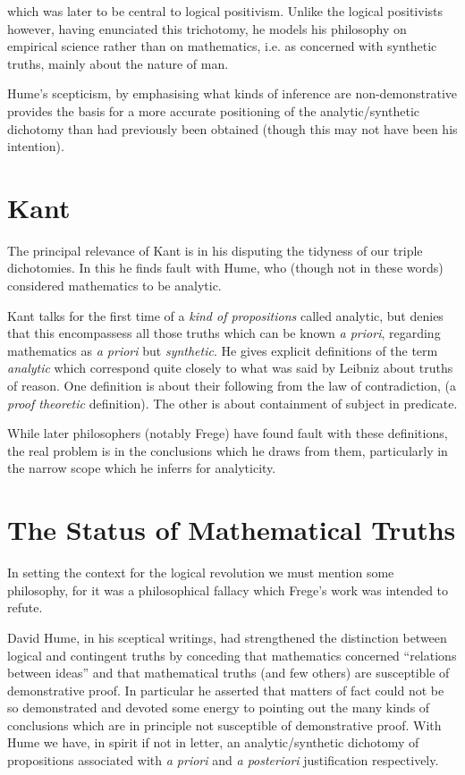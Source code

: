 which was later to be central to logical positivism.
Unlike the logical positivists however, having enunciated this trichotomy, he models his philosophy on empirical science rather than on mathematics, i.e. as concerned with synthetic truths, mainly about the nature of man.

Hume's scepticism, by emphasising what kinds of inference are non-demonstrative provides the basis for a more accurate positioning of the analytic/synthetic dichotomy than had previously been obtained (though this may not have been his intention).


\section{Kant}

The principal relevance of Kant is in his disputing the tidyness of our triple dichotomies.
In this he finds fault with Hume, who (though not in these words) considered mathematics to be analytic.

Kant talks for the first time of a {\it kind of propositions} called analytic, but denies that this encompassess all those truths which can be known {\it a priori}, regarding mathematics as {\it a priori} but {\it synthetic}.
He gives explicit definitions of the term {\it analytic} which correspond quite closely to what was said by Leibniz about truths of reason.
One definition is about their following from the law of contradiction, (a {\it proof theoretic} definition).
The other is about containment of subject in predicate.

While later philosophers (notably Frege) have found fault with these definitions, the real problem is in the conclusions which he draws from them, particularly in the narrow scope which he inferrs for analyticity.


\section{The Status of Mathematical Truths}

In setting the context for the logical revolution we must mention some philosophy, for it was a philosophical fallacy which Frege's work was intended to refute.

David Hume, in his sceptical writings, had strengthened the distinction between logical and contingent truths by conceding that mathematics concerned ``relations between ideas'' and that mathematical truths (and few others) are susceptible of demonstrative proof.
In particular he asserted that matters of fact could not be so demonstrated and devoted some energy to pointing out the many kinds of conclusions which are in principle not susceptible of demonstrative proof.
With Hume we have, in spirit if not in letter, an analytic/synthetic dichotomy of propositions associated with {\it a priori} and {\it a posteriori} justification respectively.

